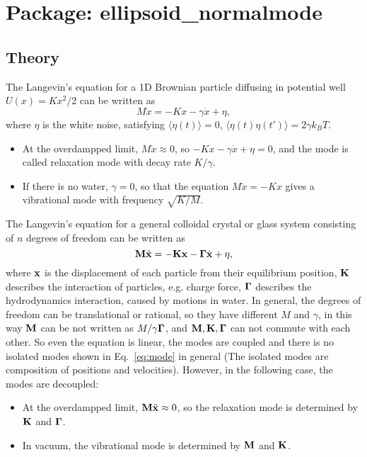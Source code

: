\chapter{Package: ellipsoid\_normalmode}
\section{Theory}
The Langevin's equation for a 1D Brownian particle diffusing in potential well $U(x)=Kx^2/2$ can be written as
\begin{equation}
M\ddot{x}=-Kx-\gamma\dot{x}+\eta,
\label{eq:mode}
\end{equation}
where $\eta$ is the white noise, satisfying $\langle \eta(t) \rangle=0$, $\langle \eta (t) \eta(t') \rangle =2\gamma k_BT$.
\begin{itemize}
\item At the overdampped limit, $M\ddot{x}\approx0$, so $-Kx-\gamma\dot{x}+\eta=0$, and the mode is called relaxation mode with decay rate $K/\gamma$.
\item If there is no water, $\gamma=0$, so that the equation $M\ddot{x}=-Kx$ gives a vibrational mode with frequency $\sqrt{K/M}$.
\end{itemize}

The Langevin's equation for a general colloidal crystal or glass system consisting of $n$ degrees of freedom can be written as
\begin{equation}
\mathbf{M}\ddot{\mathbf{x}}=-\mathbf{Kx}-\mathbf{\Gamma}\dot{\mathbf{x}}+\mathbf{\eta},
\end{equation}
where $\mathbf{x}$ is the displacement of each particle from their equilibrium position, $\mathbf{K}$ describes the interaction of particles, e.g. charge force, $\mathbf{\Gamma}$ describes the hydrodynamics interaction, caused by motions in water. 
In general, the degrees of freedom can be translational or rational, so they have different $M$ and $\gamma$, in this way $\mathbf{M}$ can be not written as $M/\gamma\mathbf{\Gamma}$, and $\mathbf{M}, \mathbf{K}, \mathbf{\Gamma}$ can not commute with each other. So even the equation is linear, the modes are coupled and there is no isolated modes shown in Eq.~\ref{eq:mode} in general (The isolated modes are composition of positions and velocities). However, in the following case, the modes are decoupled:
\begin{itemize}
\item At the overdampped limit, $\mathbf{M}\ddot{\mathbf{x}}\approx0$, so the relaxation mode is determined by $\mathbf{K}$ and $\mathbf{\Gamma}$.
\item In vacuum, the vibrational mode is determined by $\mathbf{M}$ and $\mathbf{K}$.
\end{itemize}

